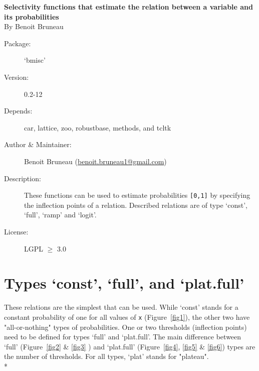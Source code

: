 \documentclass[letterpaper, 12pt]{article}
\begin{document}
\begin{titlepage}
\vspace*{3cm}
\begin{center}

\huge{\bf Selectivity functions that estimate the relation between a variable and its probabilities}\\

\vspace*{2cm}
\large{By Benoit Bruneau}
\end{center}
\vspace*{4cm}

\begin{description}
\item[Package:] `bmisc'
\item[Version:] 0.2-12
\item[Depends:] car, lattice, zoo, robustbase, methods, and tcltk
\item[Author \& Maintainer:] Benoit Bruneau (\href{mailto:benoit.bruneau1@gmail.com}{benoit.bruneau1@gmail.com})
\item[Description:] These functions can be used to estimate probabilities \verb=[0,1]= by specifying the inflection points of a relation. Described relations are of type `const', `full', `ramp' and `logit'.
\item[License:] LGPL $\geqslant$ 3.0
\end{description}


\vspace*{\fill}


\end{titlepage}

\tableofcontents
\newpage

\section{Types `const', `full', and `plat.full'}
\noindent These relations are the simplest that can be used. While `const' stands for a constant probability of one for all 
values of \verb#x# (Figure~\ref{fig1}), the other two have "all-or-nothing" types of probabilities. One or two thresholds 
(inflection points) need to be defined for types `full' and `plat.full'. The main difference between `full'
(Figure~\ref{fig2} \& \ref{fig3} ) 
and `plat.full' (Figure~\ref{fig4}, \ref{fig5} \& \ref{fig6}) types are the number of thresholds. For all types, `plat' stands for "plateau".\\*
\end{document}
